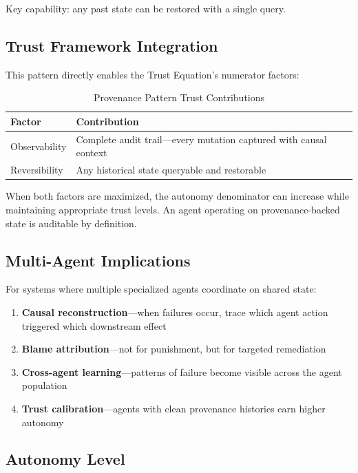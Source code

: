 Key capability: any past state can be restored with a single query.

\subsection{Trust Framework Integration}

This pattern directly enables the Trust Equation's numerator factors:

\begin{table}[htbp]
\centering
\caption{Provenance Pattern Trust Contributions}
\label{tab:provenance-trust}
\begin{tabular}{ll}
\toprule
\textbf{Factor} & \textbf{Contribution} \\
\midrule
Observability & Complete audit trail---every mutation captured with causal context \\
Reversibility & Any historical state queryable and restorable \\
\bottomrule
\end{tabular}
\end{table}

When both factors are maximized, the autonomy denominator can increase while maintaining appropriate trust levels. An agent operating on provenance-backed state is auditable by definition.

\subsection{Multi-Agent Implications}

For systems where multiple specialized agents coordinate on shared state:

\begin{enumerate}
    \item \textbf{Causal reconstruction}---when failures occur, trace which agent action triggered which downstream effect
    \item \textbf{Blame attribution}---not for punishment, but for targeted remediation
    \item \textbf{Cross-agent learning}---patterns of failure become visible across the agent population
    \item \textbf{Trust calibration}---agents with clean provenance histories earn higher autonomy
\end{enumerate}

\subsection{Autonomy Level}

